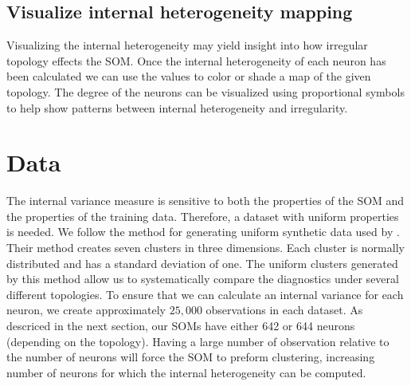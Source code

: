 \subsection{Visualize internal heterogeneity mapping}
Visualizing the internal heterogeneity may yield insight into how irregular topology
effects the SOM.  Once the internal heterogeneity of each neuron has been calculated
we can use the values to color or shade a map of the given topology.  
The degree of the neurons can be visualized using proportional symbols to help show patterns between internal heterogeneity and irregularity.

\section{Data}
\label{meth:data}
The internal variance measure is sensitive to both the properties of the SOM
and the properties of the training data. Therefore, a dataset with uniform
properties is needed. We follow the method for generating uniform synthetic
data used by \cite{wu2006}.  Their method creates seven clusters in three
dimensions.  Each cluster is normally distributed and has a standard deviation
of one.  The uniform clusters generated by this method allow us to
systematically compare the diagnostics under several different topologies.  To
ensure that we can calculate an internal variance for each neuron, we create
approximately $25,000$ observations in each dataset.  As descriced in the next
section, our SOMs have either 642 or 644 neurons (depending on the topology).
Having a large number of observation relative to the number of neurons will
force the SOM to preform clustering, increasing number of neurons for which
the internal heterogeneity can be computed.





